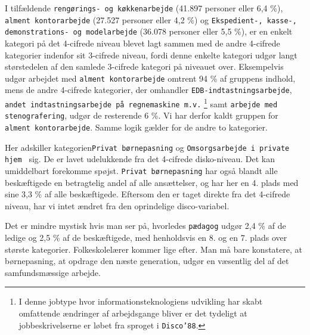 




I tilfældende  \texttt{rengørings- og køkkenarbejde} (41.897 personer eller 6,4 \%), \texttt{alment kontorarbejde} (27.527 personer eller 4,2 \%) og \texttt{Ekspedient-, kasse-,  demonstrations- og modelarbejde} (36.078 personer eller 5,5 \%), er en enkelt kategori på det 4-cifrede niveau blevet lagt sammen med de andre 4-cifrede kategorier indenfor sit 3-cifrede niveau, fordi denne enkelte kategori udgør langt størstedelen af den samlede 3-cifrede kategori på niveauet over. Eksempelvis udgør arbejdet med \texttt{alment kontorarbejde} omtrent 94 \% af gruppens indhold, mens de andre 4-cifrede kategorier, der omhandler \texttt{EDB-indtastningsarbejde}, \texttt{andet indtastningsarbejde på regnemaskine m.v.}%
%
\footnote{I denne jobtype hvor informationsteknologiens udvikling har skabt omfattende ændringer af arbejdsgange bliver er det tydeligt at jobbeskrivelserne er løbet fra sproget i \texttt{Disco'88}.}%
%
samt \texttt{arbejde med stenografering}, udgør de resterende 6 \%. Vi har derfor kaldt gruppen for \texttt{alment kontorarbejde}. Samme logik gælder for de andre to kategorier.



Her adskiller kategorien\texttt{Privat børnepasning} og \texttt{Omsorgsarbejde i private hjem
} sig. De er lavet udelukkende fra det 4-cifrede disko-niveau. Det kan umiddelbart forekomme spøjst. \texttt{Privat børnepasning} har også blandt alle beskæftigede en betragtelig andel af alle ansættelser, og har her en 4. plads med sine 3,3 \% af alle beskæftigede. Eftersom den er taget direkte fra det 4-cifrede niveau, har vi intet ændret fra den oprindelige disco-variabel.


Det er mindre mystisk hvis man ser på, hvorledes \texttt{pædagog} udgør 2,4 \% af de ledige og 2,5 \% af de beskæftigede, med henholdsvis en 8. og en 7. plads over største kategorier. Folkeskolelærer kommer lige efter. Man må bare konstatere, at børnepasning, at opdrage den næste generation, udgør en væsentlig del af det samfundsmæssige arbejde. %



